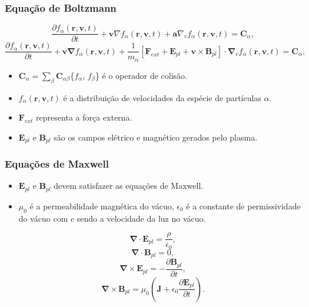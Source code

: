 \documentclass[aspectratio=169]{beamer}
\begin{document}
   \begin{frame}
		\frametitle{Equação de Boltzmann}
		
\begin{equation}
\label{eq: boltsmam}
\frac{\partial f_\alpha(\bm{r},\bm{v},t)}{\partial t} +\bm{v} \nabla f_\alpha(\bm{r},\bm{v},t) + \bm{a} \nabla_v f_\alpha(\bm{r},\bm{v},t) = \bm{C}_\alpha,
\end{equation} 
\begin{equation}
\label{eq: boltzzz}
\frac{\partial f_\alpha(\bm{r},\bm{v},t)}{\partial t} +\bm{v} \bm{\nabla} f_\alpha(\bm{r},\bm{v},t) + \frac{1}{m_\alpha}[\bm{F}_{ext}+\bm{E}_{pl}+\bm{v} \times \bm{B}_{pl}] \cdot \bm{\nabla}_v f_\alpha(\bm{r},\bm{v},t)= \bm{C}_\alpha,
\end{equation}
\begin{itemize}
\item $\bm{C}_\alpha = \sum_\beta \bm{C}_{\alpha \beta}$\{$f_\alpha$, $f_\beta$\} é o operador de colisão.
\item  $f_\alpha(\bm{r},\bm{v},t)$ é a distribuição de velocidades da espécie de partículas $\alpha$.
\item  $\bm{F}_{ext}$ representa a força externa.
\item $\bm{E}_{pl}$ e $\bm{B}_{pl}$ são os campos elétrico e magnético gerados pelo plasma.%
\end{itemize}

	\end{frame}
	
   \begin{frame}
\frametitle{Equações de Maxwell}

\begin{itemize}
\item $\bm{E}_{pl}$ e $\bm{B}_{pl}$  devem satisfazer as equações de Maxwell.
\item $\mu_0$ é a permeabilidade magnética do vácuo, $\epsilon_0$ é a constante de permissividade do vácuo com $c$ sendo a velocidade da luz no vácuo. 
\end{itemize}
\begin{equation}
\label{eq: max1}
\bm{\nabla} \cdot \bm{E}_{pl} = \frac{\rho}{\epsilon_0},
\end{equation}
\begin{equation}
\label{eq: max2}
\bm{\nabla} \cdot \bm{B}_{pl} = 0,
\end{equation}
\begin{equation}
\label{eq: max3}
\bm{\nabla} \times \bm{E}_{pl} = -\frac{\partial \bm{B}_{pl}}{\partial t},
\end{equation}
\begin{equation}
\label{eq: max4}
\bm{\nabla} \times \bm{B}_{pl} = \mu_0 (\bm{J} + \epsilon_0 \frac{\partial \bm{E}_{pl}}{\partial t} ).
\end{equation}
\end{frame}
\end{document}
